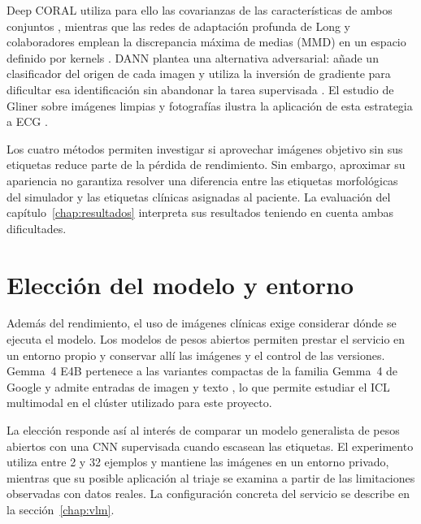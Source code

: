 Deep CORAL utiliza para ello las covarianzas de las características de ambos conjuntos \cite{sun2016deepcoral}, mientras que las redes de adaptación profunda de Long y colaboradores emplean la discrepancia máxima de medias (MMD) en un espacio definido por kernels \cite{long2015dan}. DANN plantea una alternativa adversarial: añade un clasificador del origen de cada imagen y utiliza la inversión de gradiente para dificultar esa identificación sin abandonar la tarea supervisada \cite{ganin2016}. El estudio de Gliner sobre imágenes limpias y fotografías ilustra la aplicación de esta estrategia a ECG \cite{gliner2023}.

Los cuatro métodos permiten investigar si aprovechar imágenes objetivo sin sus etiquetas reduce parte de la pérdida de rendimiento. Sin embargo, aproximar su apariencia no garantiza resolver una diferencia entre las etiquetas morfológicas del simulador y las etiquetas clínicas asignadas al paciente. La evaluación del capítulo~\ref{chap:resultados} interpreta sus resultados teniendo en cuenta ambas dificultades.

\section{Elección del modelo y entorno}

Además del rendimiento, el uso de imágenes clínicas exige considerar dónde se ejecuta el modelo. Los modelos de pesos abiertos permiten prestar el servicio en un entorno propio y conservar allí las imágenes y el control de las versiones. Gemma~4 E4B pertenece a las variantes compactas de la familia Gemma~4 de Google y admite entradas de imagen y texto \cite{gemma4card}, lo que permite estudiar el ICL multimodal en el clúster utilizado para este proyecto.

La elección responde así al interés de comparar un modelo generalista de pesos abiertos con una CNN supervisada cuando escasean las etiquetas. El experimento utiliza entre 2 y 32 ejemplos y mantiene las imágenes en un entorno privado, mientras que su posible aplicación al triaje se examina a partir de las limitaciones observadas con datos reales. La configuración concreta del servicio se describe en la sección~\ref{chap:vlm}.
